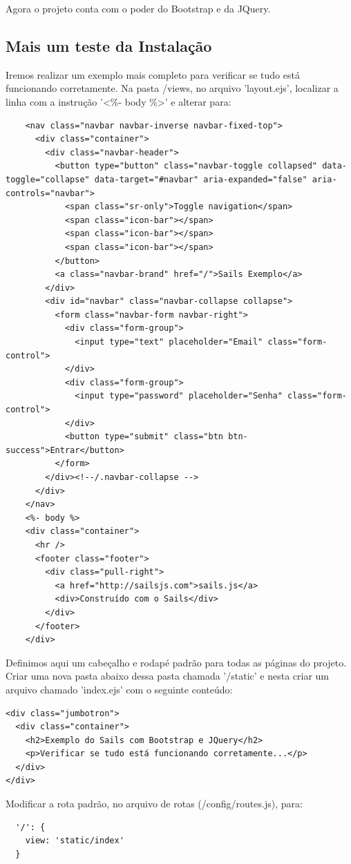\documentclass[a4paper,11pt]{article}
\begin{document}
Agora o projeto conta com o poder do Bootstrap e da JQuery.

\subsection{Mais um teste da Instalação}
Iremos realizar um exemplo mais completo para verificar se tudo está funcionando corretamente. Na pasta /views, no arquivo 'layout.ejs', localizar a linha com a instrução '\textless\%- body \%\textgreater' e alterar para:
\begin{lstlisting}
    <nav class="navbar navbar-inverse navbar-fixed-top">
      <div class="container">
        <div class="navbar-header">
          <button type="button" class="navbar-toggle collapsed" data-toggle="collapse" data-target="#navbar" aria-expanded="false" aria-controls="navbar">
            <span class="sr-only">Toggle navigation</span>
            <span class="icon-bar"></span>
            <span class="icon-bar"></span>
            <span class="icon-bar"></span>
          </button>
          <a class="navbar-brand" href="/">Sails Exemplo</a>
        </div>
        <div id="navbar" class="navbar-collapse collapse">
          <form class="navbar-form navbar-right">
            <div class="form-group">
              <input type="text" placeholder="Email" class="form-control">
            </div>
            <div class="form-group">
              <input type="password" placeholder="Senha" class="form-control">
            </div>
            <button type="submit" class="btn btn-success">Entrar</button>
          </form>
        </div><!--/.navbar-collapse -->
      </div>
    </nav>
    <%- body %>
    <div class="container">
      <hr />
      <footer class="footer">
        <div class="pull-right">
          <a href="http://sailsjs.com">sails.js</a>
          <div>Construído com o Sails</div>
        </div>
      </footer>
    </div>  
\end{lstlisting}

Definimos aqui um cabeçalho e rodapé padrão para todas as páginas do projeto. Criar uma nova pasta abaixo dessa pasta chamada '/static' e nesta criar um arquivo chamado 'index.ejs' com o seguinte conteúdo:
\begin{lstlisting}
<div class="jumbotron">
  <div class="container">
    <h2>Exemplo do Sails com Bootstrap e JQuery</h2>
    <p>Verificar se tudo está funcionando corretamente...</p>
  </div>
</div>
\end{lstlisting}

Modificar a rota padrão, no arquivo de rotas (/config/routes.js), para:
\begin{lstlisting}
  '/': {
    view: 'static/index'
  }
\end{lstlisting}
\end{document}
